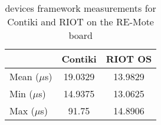 \begin{table}[!ht]
  \centering
  \begin{tabular}{l|c|c}
                & Contiki  & RIOT OS \\ \hline
  Mean ($\mu$s) & 19.0329  & 13.9829 \\
  Min  ($\mu$s) & 14.9375  & 13.0625 \\
  Max  ($\mu$s) & 91.75    & 14.8906
  \end{tabular}
  \caption{devices framework measurements for Contiki and RIOT on the RE-Mote board}
  \label{tab:devices-framework-remote}
  \end{table}